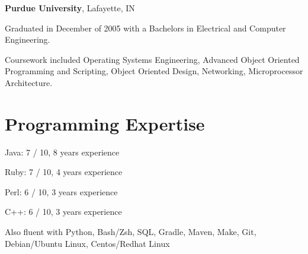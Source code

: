 \documentclass[margin,line]{resume}
\begin{document}
\begin{resume}
	{\bf Purdue University}, Lafayette, IN \vspace{2mm}
	\begin{list2}
		\vspace*{1mm}
	\item
		Graduated in December of 2005 with a Bachelors in Electrical and
		Computer Engineering.
	\item
		Coursework included Operating Systems Engineering, Advanced Object Oriented
		Programming and Scripting, Object Oriented Design, Networking, Microprocessor
		Architecture.
	\end{list2}


	\section{\mysidestyle Programming Expertise} 
	\begin{list2}
	\item 
		Java: 7 / 10, 8 years experience
	\item 
		Ruby: 7 / 10, 4 years experience
	\item
		Perl: 6 / 10, 3 years experience
	\item
		C++: 6 / 10, 3 years experience
	\item
		Also fluent with Python, Bash/Zsh, SQL, Gradle, Maven, Make, Git, Debian/Ubuntu Linux, Centos/Redhat Linux
	\end{list2}


\end{resume}
\end{document}
